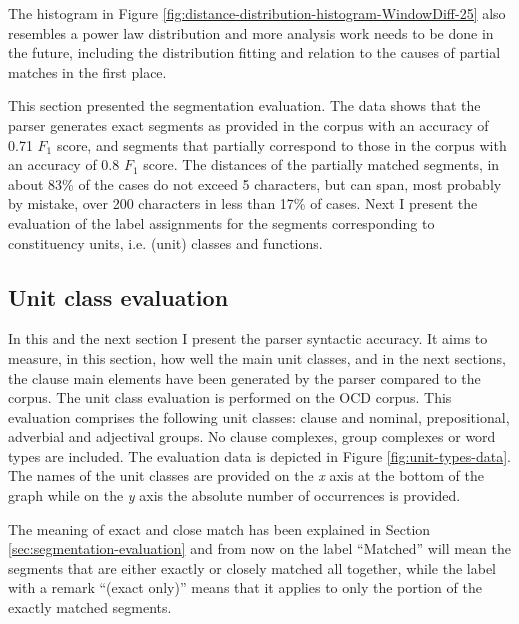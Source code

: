     The histogram in Figure \ref{fig:distance-distribution-histogram-WindowDiff-25} also resembles a power law distribution and more analysis work needs to be done in the future, including the distribution fitting and relation to the causes of partial matches in the first place. 
    
    This section presented the segmentation evaluation. The data shows that the parser generates exact segments as provided in the corpus with an accuracy of 0.71 $F_1$ score, and segments that partially correspond to those in the corpus with an accuracy of 0.8 $F_1$ score. The distances of the partially matched segments, in about 83\% of the cases do not exceed 5 characters, but can span, most probably by mistake, over 200 characters in less than 17\% of cases. Next I present the evaluation of the label assignments for the segments corresponding to constituency units, i.e. (unit) classes and functions.

\subsection{Unit class evaluation}
\label{sec:unit-class-evaluation}
    In this and the next section I present the parser syntactic accuracy. It aims to measure, in this section, how well the main unit classes, and in the next sections, the clause main elements have been generated by the parser compared to the corpus. The unit class evaluation is performed on the OCD corpus. This evaluation comprises the following unit classes: clause and nominal, prepositional, adverbial and adjectival groups. No clause complexes, group complexes or word types are included. The evaluation data is depicted in Figure \ref{fig:unit-types-data}. The names of the unit classes are provided on the \textit{x} axis at the bottom of the graph while on the \textit{y} axis the absolute number of occurrences is provided. 
    
    The meaning of exact and close match has been explained in Section \ref{sec:segmentation-evaluation} and from now on the label ``Matched'' will mean the segments that are either exactly or closely matched all together, while the label with a remark ``(exact only)'' means that it applies to only the portion of the exactly matched segments. 
    
